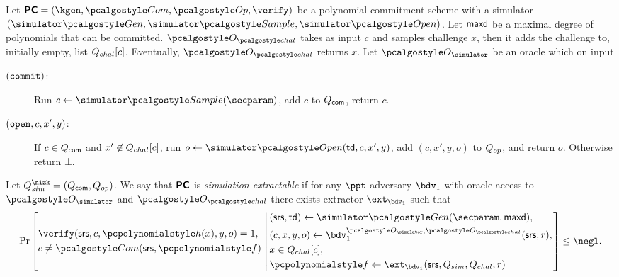 \documentclass[runningheads,11pt]{llncs}
\begin{document}
\begin{definition}
  \label{def:se_bdv1}
  Let $\PCOM = (\kgen, \com, \op, \verify)$ be a polynomial commitment scheme with a
  simulator $(\simgen, \simsample, \simopen)$. Let $\mathsf{maxd}$ be a maximal degree of
  polynomials that can be committed. $\oraclec$ takes as input $c$ and samples
  challenge $x$, then it adds the challenge to, initially empty, list
  ${Q_{chal}}[c]$.  Eventually, $\oraclec$ returns $x$. Let $\oracles$ be an oracle which on input
     \begin{description}
     \item[$(\mathtt{commit})$:] Run $c \gets \simsample (\secparam)$, add $c$ to
       $Q_{\mathsf{com}}$, return $c$.
     \item[$(\mathtt{open}, c, x', y)$:] If $c \in Q_{\mathsf{com}}$ and $x' \not\in {Q_{chal}}[c]$, run
       $o \gets \simopen(\td, c, x', y)$, add $(c, x', y, o)$ to $Q_{op}$, and return
       $o$. Otherwise return $\bot$.
     \end{description}
     Let $\Qsim = (\Qcom, \Qop)$.  We say that $\bm{\mathsf{PC}}$ is \emph{simulation
       extractable} if for any $\ppt$ adversary $\bdv_1$ with oracle access to
     $\oracles$ and $\oraclec$ there exists extractor $\ext_{\bdv_1}$ such that
     \[
       \Pr \left[
         \begin{aligned}
           & \verify(\srs, c, \ph{x}, y, o) = 1, \\
           & c \neq \com(\srs, \p{f})\\
         \end{aligned}
         \,\left|\, \vphantom{
             \begin{aligned}
               & \\
               & \\
               & \\
               &
             \end{aligned}
           }
           \begin{aligned}
             & (\srs, \td) \gets \simgen(\secparam, \maxdeg),\\
             & (c, x, y, o) \gets \bdv_1^{\oracles,\oraclec}(\srs; r), \\
             & x \in \Qchal[c], \\
             & \p{f} \gets \ext_{\bdv_1}(\srs, Q_{sim}, Q_{chal}; r)
           \end{aligned}
         \right.\right] \leq \negl.
\]
\end{definition}
\end{document}
